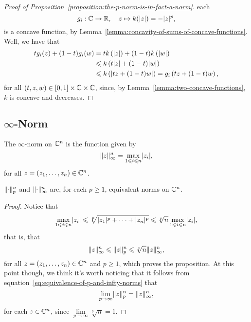 \begin{proof}[Proof of Proposition~\ref{proposition:the-p-norm-is-in-fact-a-norm}]
  each
  \[
    g_{i}:\mathbb{C}\to\mathbb{R},\quad{z\mapsto{k(\lvert z\rvert)=-\lvert z\rvert^{p}}},
  \]
  is a concave function, by
  Lemma~\ref{lemma:concavity-of-sums-of-concave-functions}. Well, we have that
  \begin{align*}
    tg_{i}(z)+(1-t)g_{i}(w)
    &=
    tk\left(\lvert z\rvert\right)+(1-t)k\left(\lvert w\rvert\right)
    \\
    &\leqslant
    k\left(t\lvert z\rvert+(1-t)\lvert w\rvert\right)
    \\
    &\leqslant
    k\left(\lvert tz+(1-t)w\rvert\right)
    =
    g_{i}\left(tz+(1-t)w\right),
  \end{align*}
  for all \((t,z,w)\in{[0,1]\times\mathbb{C}\times\mathbb{C}}\), since,
  by Lemma~\ref{lemma:two-concave-functions}, \(k\) is concave and decreases.
\end{proof}

\subsection{\(\infty\)-Norm}\label{subsec:infty-norm}

\begin{definition}
  The \(\infty\)-norm on \(\mathbb{C}^{n}\) is the function given by
  \[
    \norm<n>[\infty](z)
    =
    \max\limits_{1\leqslant{i}\leqslant{n}}\abs{z_{i}},
  \]
  for all \(z=(z_{1},\ldots,z_{n})\in\mathbb{C}^{n}\).
\end{definition}

\begin{proposition}
  \(\norm<n>[p]\) and \(\norm<n>[\infty]\) are, for each \(p\geqslant{1}\),
  equivalent norms on \(\mathbb{C}^{n}\).
\end{proposition}

\begin{proof}
  Notice that
  \[
    \max\limits_{1\leqslant{i}\leqslant{n}}\lvert z_{i}\rvert
    \leqslant\sqrt[p]{\lvert z_{1}\rvert^{p}+\cdots+\lvert z_{n}\rvert^{p}}
    \leqslant\sqrt[p]{n}\max\limits_{1\leqslant{i}\leqslant{n}}\lvert z_{i}\rvert,
  \]
  that is, that
  \begin{equation}\label{eq:equivalence-of-p-and-infty-norms}
    \norm<n>[\infty](z)
    \leqslant
    \norm<n>[p](z)
    \leqslant
    \sqrt[p]{n}\norm<n>[\infty](z),
  \end{equation}
  for all \(z=(z_{1},\ldots,z_{n})\in\mathbb{C}^{n}\) and \(p\geqslant{1}\),
  which proves the proposition. At this point though, we think it's worth
  noticing that it follows from
  equation~\eqref{eq:equivalence-of-p-and-infty-norms} that
  \[
    \lim\limits_{p\to\infty}\norm<n>[p](z)=\norm<n>[\infty](z),
  \]
  for each \(z\in\mathbb{C}^{n}\), since
  \(\lim\limits_{p\to\infty}\sqrt[p]{n}=1\).
\end{proof}

